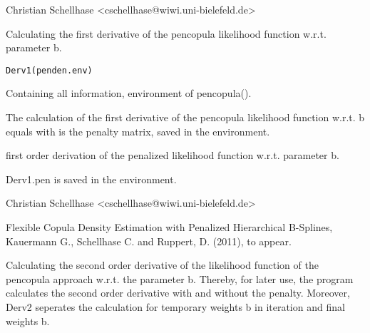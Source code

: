 \documentclass[a4paper]{book}
\begin{document}
%
\begin{Author}\relax
Christian Schellhase <cschellhase@wiwi.uni-bielefeld.de>
\end{Author}
%
\begin{Description}\relax
Calculating the first derivative of the pencopula likelihood function w.r.t. parameter b. 
\end{Description}
%
\begin{Usage}
\begin{verbatim}
Derv1(penden.env)
\end{verbatim}
\end{Usage}
%
\begin{Arguments}
\begin{ldescription}
\item[\code{penden.env}] Containing all information, environment of pencopula().
\end{ldescription}
\end{Arguments}
%
\begin{Details}\relax
The calculation of the first derivative of the pencopula likelihood function w.r.t. b equals
with 
is the penalty matrix, saved in the environment.
\end{Details}
%
\begin{Value}
\begin{ldescription}
\item[\code{Derv1.pen}] first order derivation of the penalized likelihood
function w.r.t. parameter b.
\end{ldescription}
Derv1.pen is saved in the environment.
\end{Value}
%
\begin{Author}\relax
Christian Schellhase <cschellhase@wiwi.uni-bielefeld.de>
\end{Author}
%
\begin{References}\relax
Flexible Copula Density Estimation with Penalized
Hierarchical B-Splines, Kauermann G., Schellhase C. and Ruppert,
D. (2011), to appear.
\end{References}
%
\begin{Description}\relax
Calculating the second order derivative of the likelihood function of
the pencopula approach w.r.t. the parameter b. Thereby, for later use,
the program calculates the second order derivative with and without the
penalty. Moreover, Derv2 seperates the calculation for temporary weights
b in iteration and final weights b.
\end{Description}
\end{document}
